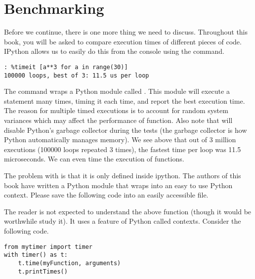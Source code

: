 
\section*{Benchmarking}
Before we continue, there is one more thing we need to discuss.  Throughout this book, you will be asked to compare execution times of different pieces of code.  IPython allows us to easily do this from the console using the  command.
\begin{lstlisting}
: %timeit [a**3 for a in range(30)]
100000 loops, best of 3: 11.5 us per loop
\end{lstlisting}
The  command wraps a Python module called .  This module will execute a statement many times, timing it each time, and report the best execution time.  The reason for multiple timed executions is to account for random system variances which may affect the performance of function.  Also note that  will disable Python's garbage collector during the tests (the garbage collector is how Python automatically manages memory).  We see above that out of 3 million executions (100000 loops repeated 3 times), the fastest time per loop was 11.5 microseconds.  We can even time the execution of functions.

The problem with  is that it is only defined inside ipython.  The authors of this book have written a Python module that wraps  into an easy to use Python context.  Please save the following code into an easily accessible file.



The reader is not expected to understand the above function (though it would be worthwhile study it).  It uses a feature of Python called contexts.  Consider the following code.
\begin{lstlisting}
from mytimer import timer
with timer() as t:
    t.time(myFunction, arguments)
    t.printTimes()
\end{lstlisting}

